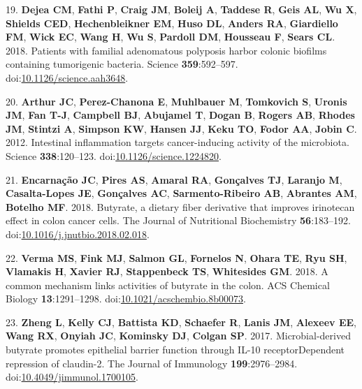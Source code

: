 \documentclass[11pt,]{article}
\begin{document}
\leavevmode\hypertarget{ref-Dejea2018}{}%
19. \textbf{Dejea CM}, \textbf{Fathi P}, \textbf{Craig JM},
\textbf{Boleij A}, \textbf{Taddese R}, \textbf{Geis AL}, \textbf{Wu X},
\textbf{Shields CED}, \textbf{Hechenbleikner EM}, \textbf{Huso DL},
\textbf{Anders RA}, \textbf{Giardiello FM}, \textbf{Wick EC},
\textbf{Wang H}, \textbf{Wu S}, \textbf{Pardoll DM}, \textbf{Housseau
F}, \textbf{Sears CL}. 2018. Patients with familial adenomatous
polyposis harbor colonic biofilms containing tumorigenic bacteria.
Science \textbf{359}:592--597.
doi:\href{https://doi.org/10.1126/science.aah3648}{10.1126/science.aah3648}.

\leavevmode\hypertarget{ref-Arthur2012}{}%
20. \textbf{Arthur JC}, \textbf{Perez-Chanona E}, \textbf{Muhlbauer M},
\textbf{Tomkovich S}, \textbf{Uronis JM}, \textbf{Fan T-J},
\textbf{Campbell BJ}, \textbf{Abujamel T}, \textbf{Dogan B},
\textbf{Rogers AB}, \textbf{Rhodes JM}, \textbf{Stintzi A},
\textbf{Simpson KW}, \textbf{Hansen JJ}, \textbf{Keku TO}, \textbf{Fodor
AA}, \textbf{Jobin C}. 2012. Intestinal inflammation targets
cancer-inducing activity of the microbiota. Science
\textbf{338}:120--123.
doi:\href{https://doi.org/10.1126/science.1224820}{10.1126/science.1224820}.

\leavevmode\hypertarget{ref-Encarnao2018}{}%
21. \textbf{Encarnação JC}, \textbf{Pires AS}, \textbf{Amaral RA},
\textbf{Gonçalves TJ}, \textbf{Laranjo M}, \textbf{Casalta-Lopes JE},
\textbf{Gonçalves AC}, \textbf{Sarmento-Ribeiro AB}, \textbf{Abrantes
AM}, \textbf{Botelho MF}. 2018. Butyrate, a dietary fiber derivative
that improves irinotecan effect in colon cancer cells. The Journal of
Nutritional Biochemistry \textbf{56}:183--192.
doi:\href{https://doi.org/10.1016/j.jnutbio.2018.02.018}{10.1016/j.jnutbio.2018.02.018}.

\leavevmode\hypertarget{ref-Verma2018}{}%
22. \textbf{Verma MS}, \textbf{Fink MJ}, \textbf{Salmon GL},
\textbf{Fornelos N}, \textbf{Ohara TE}, \textbf{Ryu SH},
\textbf{Vlamakis H}, \textbf{Xavier RJ}, \textbf{Stappenbeck TS},
\textbf{Whitesides GM}. 2018. A common mechanism links activities of
butyrate in the colon. ACS Chemical Biology \textbf{13}:1291--1298.
doi:\href{https://doi.org/10.1021/acschembio.8b00073}{10.1021/acschembio.8b00073}.

\leavevmode\hypertarget{ref-Zheng2017}{}%
23. \textbf{Zheng L}, \textbf{Kelly CJ}, \textbf{Battista KD},
\textbf{Schaefer R}, \textbf{Lanis JM}, \textbf{Alexeev EE},
\textbf{Wang RX}, \textbf{Onyiah JC}, \textbf{Kominsky DJ},
\textbf{Colgan SP}. 2017. Microbial-derived butyrate promotes epithelial
barrier function through IL-10 receptorDependent repression of
claudin-2. The Journal of Immunology \textbf{199}:2976--2984.
doi:\href{https://doi.org/10.4049/jimmunol.1700105}{10.4049/jimmunol.1700105}.
\end{document}
